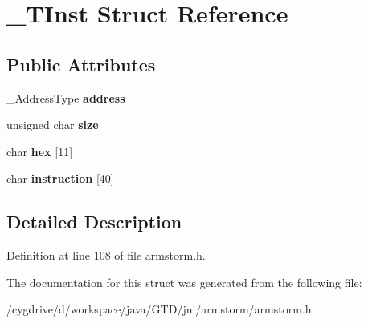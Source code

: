 \hypertarget{struct__TInst}{\section{\-\_\-\-T\-Inst Struct Reference}
\label{struct__TInst}
}
\subsection*{Public Attributes}
\begin{DoxyCompactItemize}
\item 
\hypertarget{struct__TInst_ae0caa942e157e8f58209d019db23ed57}{\-\_\-\-Address\-Type {\bfseries address}}\label{struct__TInst_ae0caa942e157e8f58209d019db23ed57}

\item 
\hypertarget{struct__TInst_a394f14ef83291884973cc44a6a4e7866}{unsigned char {\bfseries size}}\label{struct__TInst_a394f14ef83291884973cc44a6a4e7866}

\item 
\hypertarget{struct__TInst_a2fdb0d1a81a093c3ef3e5601fe9d3162}{char {\bfseries hex} \mbox{[}11\mbox{]}}\label{struct__TInst_a2fdb0d1a81a093c3ef3e5601fe9d3162}

\item 
\hypertarget{struct__TInst_ad6a6760ed22234f9fe358150e3b6cfb3}{char {\bfseries instruction} \mbox{[}40\mbox{]}}\label{struct__TInst_ad6a6760ed22234f9fe358150e3b6cfb3}

\end{DoxyCompactItemize}


\subsection{Detailed Description}


Definition at line 108 of file armstorm.\-h.



The documentation for this struct was generated from the following file\-:\begin{DoxyCompactItemize}
\item 
/cygdrive/d/workspace/java/\-G\-T\-D/jni/armstorm/armstorm.\-h\end{DoxyCompactItemize}
